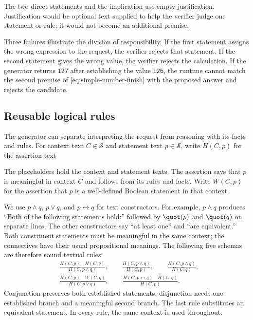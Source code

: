 \documentclass[11pt,twoside]{article}
\theoremstyle{definition}
\newcommand{\Stext}{\mathcal S}
\begin{document}
The two direct statements and the implication use empty justification. Justification
would be optional text supplied to help the verifier judge one statement or
rule; it would not become an additional premise.

Three failures illustrate the division of responsibility. If the first
statement assigns the wrong expression to the request, the verifier rejects
that statement. If the second statement gives the wrong value, the verifier
rejects the calculation. If the generator returns \texttt{127} after
establishing the value \texttt{126}, the runtime cannot match the second
premise of \cref{eq:simple-number-finish} with the proposed answer and rejects
the candidate.

\subsection{Reusable logical rules}
\label{sec:example-logic}

The generator can separate interpreting the request from reasoning with its
facts and rules. For context text $C\in\Stext$ and statement text $p\in\Stext$, write
$H(C,p)$ for the assertion text
\begin{quote}

\end{quote}
The placeholders hold the context and statement texts. The assertion says
that $p$ is meaningful in context $C$ and follows from its rules and facts.
Write $W(C,p)$ for the assertion that $p$ is a well-defined Boolean statement
in that context.

We use $p\wedge q$, $p\vee q$, and $p\leftrightarrow q$ for text constructors.
For example, $p\wedge q$ produces ``Both of the following statements hold:''
followed by $\quot(p)$ and $\quot(q)$ on separate lines. The other constructors
say ``at least one'' and ``are equivalent.'' Both constituent statements must be meaningful in the
same context; the connectives have their usual propositional meanings.
The following five schemas are therefore sound textual rules:
\begin{align}
&\frac{H(C,p)\quad H(C,q)}{H(C,p\wedge q)},\qquad
 \frac{H(C,p\wedge q)}{H(C,p)},\qquad
 \frac{H(C,p\wedge q)}{H(C,q)},\label{eq:logic-and}\\[4pt]
&\frac{H(C,p)\quad W(C,q)}{H(C,p\vee q)},\qquad
 \frac{H(C,p\leftrightarrow q)\quad H(C,q)}{H(C,p)}.
 \label{eq:logic-or-iff}
\end{align}
Conjunction preserves both established statements; disjunction needs one
established branch and a meaningful second branch. The last rule substitutes
an equivalent statement. In every rule, the same context is used throughout.
\end{document}
